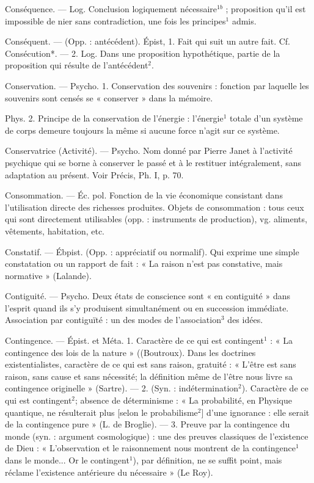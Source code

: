 Conséquence. — Log. Conclusion logiquement nécessaire$^{1b}$ ; proposition
qu’il est impossible de nier sans
contradiction, une fois les principes$^1$
admis.

Conséquent. — (Opp. : antécédent).
Épist, 1. Fait qui suit un autre fait.
Cf. Consécution*. — 2. Log. Dans
une proposition hypothétique, partie
de la proposition qui résulte de
l’antécédent$^2$.

Conservation. — Psycho. 1. Conservation des souvenirs : fonction par
laquelle les souvenirs sont censés se
« conserver » dans la mémoire.

Phys. 2. Principe de la conservation de l’énergie : l'énergie$^1$ totale
d’un système de corps demeure toujours la même si aucune force n’agit
sur ce système.

Conservatrice (Activité). — Psycho.
Nom donné par Pierre Janet à l’activité psychique qui se borne à conserver le passé et à le restituer intégralement, sans adaptation au présent. Voir Précis, Ph. I, p. 70.

Consommation. — Éc. pol. Fonction
de la vie économique consistant
dans l'utilisation directe des richesses produites. Objets de consommation : tous ceux qui sont directement utilisables (opp. : instruments
de production), vg. aliments, vêtements, habitation, etc.

Constatif. — Ébpist. (Opp. : appréciatif
ou normalif). Qui exprime une
simple constatation ou un rapport
de fait : « La raison n’est pas constative, mais normative » (Lalande).

Contiguité. — Psycho. Deux états de
conscience sont « en contiguité »
dans l'esprit quand ils s’y produisent simultanément ou en succession
immédiate. Association par contiguïté : un des modes de l’association$^3$ des idées.

Contingence. — Épist. et Méta. 1. Caractère de ce qui est contingent$^1$ :
« La contingence des lois de la
nature » ((Boutroux). Dans les doctrines existentialistes, caractère de
ce qui est sans raison, gratuité :
« L’être est sans raison, sans cause et
sans nécessité; la définition même
de l’être nous livre sa contingence
originelle » (Sartre). — 2. (Syn. :
indétermination$^2$). Caractère de ce
qui est contingent$^2$; absence de déterminisme : « La probabilité, en
Physique quantique, ne résulterait
plus [selon le probabilisme$^2$] d’une
ignorance : elle serait de la contingence pure » (L. de Broglie). — 3.
Preuve par la contingence du monde
(syn. : argument cosmologique) : une
des preuves classiques de l’existence de Dieu : « L'observation et
le raisonnement nous montrent de
la contingence$^1$ dans le monde... Or
le contingent$^1$), par définition, ne se
suffit point, mais réclame l’existence antérieure du nécessaire » (Le
Roy).


